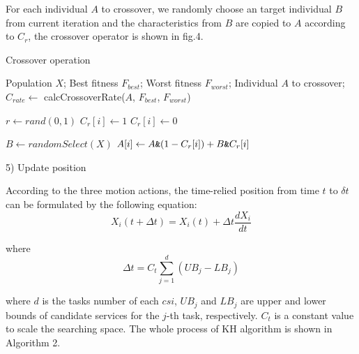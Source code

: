 \documentclass[10pt,journal,compsoc]{IEEEtran}
\begin{document}
For each individual $A$ to crossover, we randomly choose an target individual $B$ from current iteration and the characteristics from $B$ are copied to $A$ according to $C_r$, the crossover operator is shown in fig.4.

\begin{algorithm}
\caption{Crossover operation}
\label{alg1}
\begin{algorithmic}[1]

\REQUIRE Population $X$; Best fitness $F_{best}$; Worst fitness $F_{worst}$; Individual $A$ to crossover;
\STATE $C_{rate} \leftarrow$ calcCrossoverRate($A$, $F_{best}$, $F_{worst}$)

\STATE $r \leftarrow rand(0,1)$
\STATE $C_r[i] \leftarrow 1$
\ELSE
\STATE $C_r[i] \leftarrow 0$
\ENDIF
\ENDFOR

\STATE $B \leftarrow randomSelect(X)$
\STATE $A[i] \leftarrow A \verb'&'  (1-C_r[i]) + B \verb'&' C_r[i]$ 
\ENDFOR

\end{algorithmic}
\end{algorithm}

5) Update position

According to the three motion actions, the time-relied position from time $t$ to $\delta t$ can be formulated by the following equation:
\begin{equation}
X_i(t+\Delta t) = X_i(t) + \Delta t \frac{dX_i}{dt}
\end{equation}

where
\begin{equation}
\Delta t = C_t\sum_{j=1}^{d}(UB_j - LB_j)
\end{equation}

where $d$ is the tasks number of each $csi$, $UB_j$ and $LB_j$ are upper and lower bounds of candidate services for the $j$-th task, respectively. $C_t$ is a constant value to scale the searching space. The  whole process of KH algorithm is shown in Algorithm 2.
\end{document}
